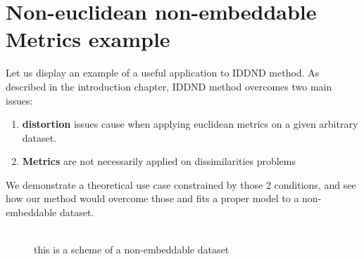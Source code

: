	
\section{Non-euclidean non-embeddable Metrics example}

Let us display an example of a useful application to IDDND method.
As described in the introduction chapter{}, IDDND method overcomes two main issues:

\begin{enumerate}
	\item \textbf{distortion} issues cause when applying euclidean metrics on a given arbitrary dataset. 
	\item \textbf{Metrics} are not necessarily applied on dissimilarities problems
\end{enumerate}

We demonstrate a theoretical use case constrained by those 2 conditions, and see how our method would overcome those and fits a proper model to a non-embeddable dataset.
\\ \\ 
\newcommand{\centert}{2.66}

\begin{figure}[h]
	\centering

	
	\caption[triangle non-embeddable dataset]
	{this is a scheme of a non-embeddable dataset}
	
	\end{figure}
	
